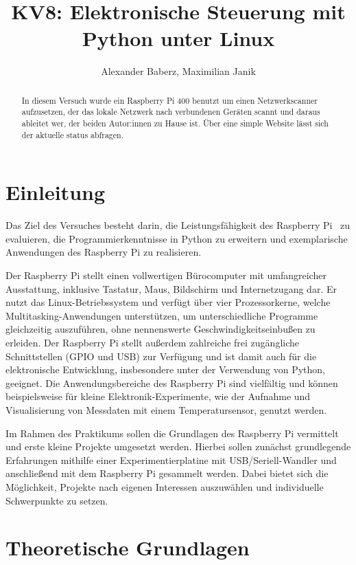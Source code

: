 \documentclass[12pt]{article}
\title{KV8: Elektronische Steuerung mit Python unter Linux}
\author{Alexander Baberz, Maximilian Janik}
\begin{document}
\maketitle
\thispagestyle{empty}

\begin{abstract}
  In diesem Versuch wurde ein Raspberry Pi 400 benutzt um einen Netzwerkscanner aufzusetzen, der das lokale Netzwerk nach
  verbundenen Geräten scannt und daraus ableitet wer, der beiden Autor:innen zu Hause ist. Über eine simple Website lässt
  sich der aktuelle status abfragen.
\end{abstract}

\section{Einleitung}
Das Ziel des Versuches besteht darin, die Leistungsfähigkeit des Raspberry Pi~\cite{raspi} zu evaluieren, die Programmierkenntnisse in Python zu erweitern und exemplarische Anwendungen des Raspberry Pi zu realisieren.

Der Raspberry Pi stellt einen vollwertigen Bürocomputer mit umfangreicher Ausstattung, inklusive Tastatur, Maus, Bildschirm und Internetzugang dar. Er nutzt das Linux-Betriebssystem und verfügt über vier Prozessorkerne, welche Multitasking-Anwendungen unterstützen, um unterschiedliche Programme gleichzeitig auszuführen, ohne nennenswerte Geschwindigkeitseinbußen zu erleiden. Der Raspberry Pi stellt außerdem zahlreiche frei zugängliche Schnittstellen (GPIO und USB) zur Verfügung und ist damit auch für die elektronische Entwicklung, insbesondere unter der Verwendung von Python, geeignet. Die Anwendungsbereiche des Raspberry Pi sind vielfältig und können beispielsweise für kleine Elektronik-Experimente, wie der Aufnahme und Visualisierung von Messdaten mit einem Temperatursensor, genutzt werden.

Im Rahmen des Praktikums sollen die Grundlagen des Raspberry Pi vermittelt und erste kleine Projekte umgesetzt werden. Hierbei sollen zunächst grundlegende Erfahrungen mithilfe einer Experimentierplatine mit USB/Seriell-Wandler und anschließend mit dem Raspberry Pi gesammelt werden. Dabei bietet sich die Möglichkeit, Projekte nach eigenen Interessen auszuwählen und individuelle Schwerpunkte zu setzen.

\newpage
\section{Theoretische Grundlagen}
\end{document}

